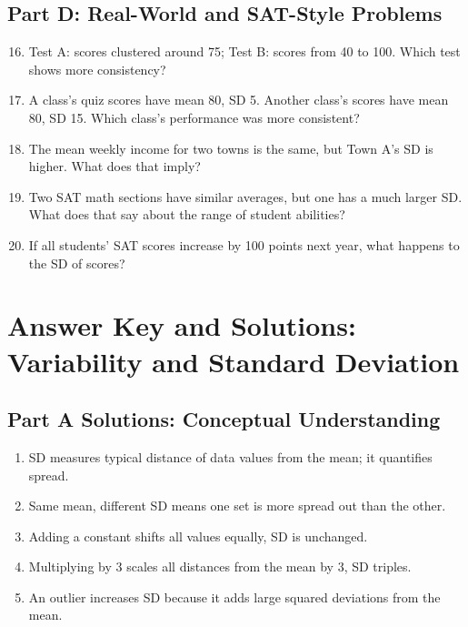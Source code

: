 \documentclass[14pt]{extarticle}
\begin{document}
\subsection*{Part D: Real-World and SAT-Style Problems}
\begin{enumerate}
  \setcounter{enumi}{15}
  \item Test A: scores clustered around 75; Test B: scores from 40 to 100. Which test shows more consistency?
  \item A class’s quiz scores have mean 80, SD 5. Another class’s scores have mean 80, SD 15. Which class’s performance was more consistent?
  \item The mean weekly income for two towns is the same, but Town A’s SD is higher. What does that imply?
  \item Two SAT math sections have similar averages, but one has a much larger SD. What does that say about the range of student abilities?
  \item If all students’ SAT scores increase by 100 points next year, what happens to the SD of scores?
\end{enumerate}

\newpage


\section*{Answer Key and Solutions: Variability and Standard Deviation}

\subsection*{Part A Solutions: Conceptual Understanding}
\begin{enumerate}
  \item SD measures typical distance of data values from the mean; it quantifies spread.
  \item Same mean, different SD means one set is more spread out than the other.
  \item Adding a constant shifts all values equally, SD is unchanged.
  \item Multiplying by 3 scales all distances from the mean by 3, SD triples.
  \item An outlier increases SD because it adds large squared deviations from the mean.
\end{enumerate}
\end{document}
